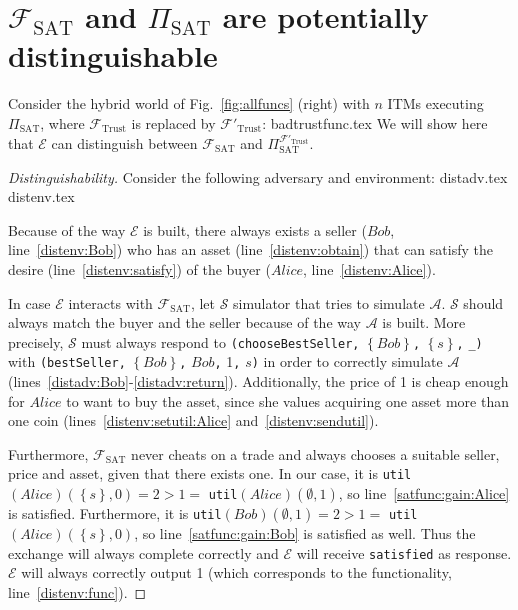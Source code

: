 \section{$\mathcal{F}_{\mathrm{SAT}}$ and $\Pi_{\mathrm{SAT}}$ are potentially
distinguishable}
  Consider the hybrid world of Fig.~\ref{fig:allfuncs} (right) with $n$ ITMs executing
  $\Pi_{\mathrm{SAT}}$, where $\mathcal{F}_{\mathrm{Trust}}$ is replaced by
  $\mathcal{F}'_{\mathrm{Trust}}$:
  {badtrustfunc.tex}
  We will show here that $\mathcal{E}$ can distinguish between
  $\mathcal{F}_{\mathrm{SAT}}$ and $\Pi_{\mathrm{SAT}}^{\mathcal{F}'_{\mathrm{Trust}}}$.
  \begin{proof}[Distinguishability]
    Consider the following adversary and environment:
    {distadv.tex}
    {distenv.tex}

    Because of the way $\mathcal{E}$ is built, there always exists a seller ($Bob$,
    line~\ref{distenv:Bob}) who has an asset (line~\ref{distenv:obtain}) that can satisfy
    the desire (line~\ref{distenv:satisfy}) of the buyer ($Alice$,
    line~\ref{distenv:Alice}).

    In case $\mathcal{E}$ interacts with $\mathcal{F}_{\mathrm{SAT}}$, let $\mathcal{S}$
    simulator that tries to simulate $\mathcal{A}$. $\mathcal{S}$ should always match the
    buyer and the seller because of the way $\mathcal{A}$ is built. More precisely,
    $\mathcal{S}$ must always respond to \texttt{(chooseBestSeller,}
    $\left\{Bob\right\}$\texttt{,} $\left\{s\right\}$\texttt{,} \texttt{\_)} with
    \texttt{(bestSeller,} $\left\{Bob\right\}$\texttt{,} $Bob$\texttt{,} 1\texttt{,}
    $s$\texttt{)} in order to correctly simulate $\mathcal{A}$
    (lines~\ref{distadv:Bob}-\ref{distadv:return}). Additionally, the price of 1 is cheap
    enough for $Alice$ to want to buy the asset, since she values acquiring one asset more
    than one coin (lines~\ref{distenv:setutil:Alice} and~\ref{distenv:sendutil}).

    Furthermore, $\mathcal{F}_{\mathrm{SAT}}$ never cheats on a trade and always chooses a
    suitable seller, price and asset, given that there exists one. In our case, it is
    \texttt{util}$\left(Alice\right)\left(\left\{s\right\}, 0\right) = 2 > 1 =$
    \texttt{util}$\left(Alice\right)\left(\emptyset, 1\right)$, so
    line~\ref{satfunc:gain:Alice} is satisfied. Furthermore, it is
    \texttt{util}$\left(Bob\right)\left(\emptyset, 1\right) = 2 > 1 =$
    \texttt{util}$\left(Alice\right)\left(\left\{s\right\}, 0\right)$, so
    line~\ref{satfunc:gain:Bob} is satisfied as well.  Thus the exchange will always
    complete correctly and $\mathcal{E}$ will receive \texttt{satisfied} as response.
    $\mathcal{E}$ will always correctly output 1 (which corresponds to the functionality,
    line~\ref{distenv:func}).


\end{proof}
